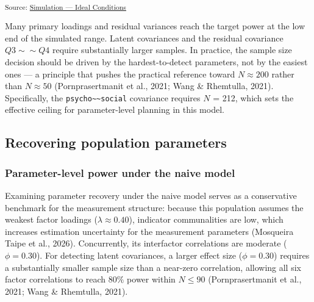 \documentclass[
  letterpaper,
  DIV=11,
  numbers=noendperiod]{scrartcl}
\begin{document}
\textsubscript{Source:
\href{https://phdpablo.github.io/cfa-power/Scripts/AnalysisScripts/03_simulation_ideal-preview.html\#cell-tbl-power-n-ideal}{Simulation
--- Ideal Conditions}}

Many primary loadings and residual variances reach the target power at
the low end of the simulated range. Latent covariances and the residual
covariance \(Q3 \sim\sim Q4\) require substantially larger samples. In
practice, the sample size decision should be driven by the
hardest-to-detect parameters, not by the easiest ones --- a principle
that pushes the practical reference toward \(N \approx 200\) rather than
\(N \approx 50\) (Pornprasertmanit et al., 2021; Wang \& Rhemtulla,
2021). Specifically, the
\texttt{psycho\textasciitilde{}\textasciitilde{}social} covariance
requires \(N\) = 212, which sets the effective ceiling for
parameter-level planning in this model.

\subsection{Recovering population
parameters}\label{recovering-population-parameters}

\subsubsection{Parameter-level power under the naive
model}\label{parameter-level-power-under-the-naive-model}

Examining parameter recovery under the naive model serves as a
conservative benchmark for the measurement structure: because this
population assumes the weakest factor loadings
(\(\lambda \approx 0.40\)), indicator communalities are low, which
increases estimation uncertainty for the measurement parameters
({Mosqueira Taipe et al.}, 2026). Concurrently, its interfactor
correlations are moderate (\(\phi = 0.30\)). For detecting latent
covariances, a larger effect size (\(\phi = 0.30\)) requires a
substantially smaller sample size than a near-zero correlation, allowing
all six factor correlations to reach \(80\%\) power within \(N \le 90\)
(Pornprasertmanit et al., 2021; Wang \& Rhemtulla, 2021).
\end{document}
